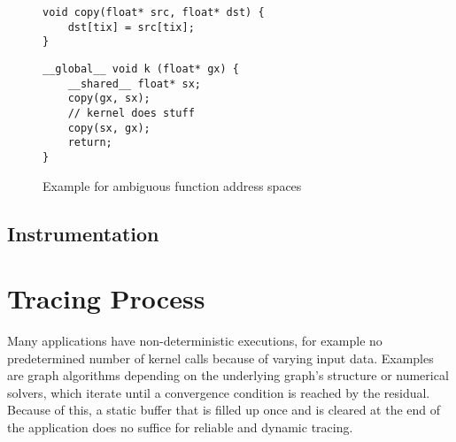 \begin{figure}[t]
	\begin{minipage}{0.45\textwidth}
		
		\begin{lstlisting}[style=c]
void copy(float* src, float* dst) {
	dst[tix] = src[tix];
}
		\end{lstlisting}
	\end{minipage}\hfill
	\begin{minipage}{0.45\textwidth}
			\begin{lstlisting}[style=c]
__global__ void k (float* gx) {
	__shared__ float* sx;
	copy(gx, sx);
	// kernel does stuff
	copy(sx, gx);
	return;
}
	\end{lstlisting}
	\end{minipage}\hfill
	\caption{Example for ambiguous function address spaces}
	\label{func-vers}
\end{figure}
\subsection{Instrumentation}\label{instru}
%
                                                                

\section{Tracing Process}
	Many applications have non-deterministic executions, for example no predetermined number of kernel calls because of varying input data. Examples are graph algorithms depending on the underlying graph's structure or numerical solvers, which iterate until a
	convergence condition is reached by the residual. Because of this, a static buffer that is filled up once and is cleared at the end of the application does no suffice for reliable and dynamic tracing.
	
